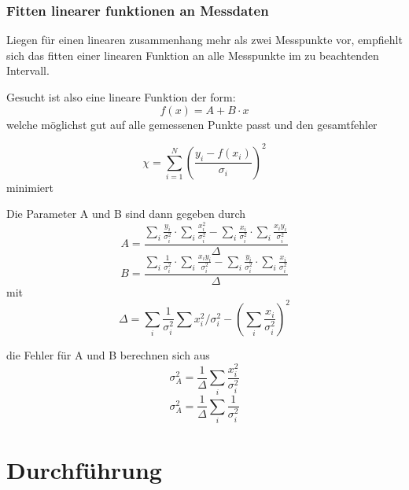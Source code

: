 \documentclass[bigchapter,colorback,accentcolor=tud4b,linedtoc,11pt]{tudreport}
\numberwithin{equation}{subsection}
\begin{document}
\subsection{Fitten linearer funktionen an Messdaten}
Liegen für einen linearen zusammenhang mehr als zwei Messpunkte vor, empfiehlt sich das fitten einer linearen Funktion an alle Messpunkte im zu beachtenden Intervall.

Gesucht ist also eine lineare Funktion der form:
\begin{equation}
  f(x) = A + B \cdot x
\end{equation}
welche möglichst gut auf alle gemessenen Punkte passt und den gesamtfehler 

\begin{equation}
  \chi = \sum\limits_{i=1}^N {\left(\frac{y_i-f(x_i)}{\sigma_i}\right)}^2
\end{equation}
minimiert

Die Parameter A und B sind dann gegeben durch
\begin{equation}
  A = \frac{\sum\limits_{i}\frac{y_i}{\sigma_i^2} \cdot \sum\limits_{i}\frac{x_i^2}{\sigma_i^2} -
  \sum\limits_{i}\frac{x_i}{\sigma_i^2} \cdot \sum\limits_{i}\frac{x_{i}y_{i}}{\sigma_i^2}}{\Delta}
\end{equation}
\begin{equation}
  B = \frac{\sum\limits_{i}\frac{1}{\sigma_i^2} \cdot \sum\limits_{i}\frac{x_{i}y_{i}}{\sigma_i^2} -
  \sum\limits_{i}\frac{y_i}{\sigma_i^2} \cdot \sum\limits_{i}\frac{x_i}{\sigma_i^2}}{\Delta}
\end{equation}
mit 
\begin{equation}
  \Delta = \sum\limits_{i}\frac{1}{\sigma_i^2}\sum{x_i^2}/{\sigma_i^2} - {(\sum\limits_{i}\frac{x_i}{\sigma_i^2})}^2
\end{equation}

die Fehler für A und B berechnen sich aus
\begin{equation}
  \sigma_A^2=\frac{1}{\Delta}\sum\limits_{i}\frac{x_i^2}{\sigma_i^2}
\end{equation}
\begin{equation}
  \sigma_A^2=\frac{1}{\Delta}\sum\limits_{i}\frac{1}{\sigma_i^2}
\end{equation}
\chapter{Durchführung}
\end{document}
